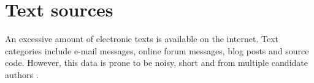 \section{Text sources}
\label{sec:text_sources}

An excessive amount of electronic texts is available on the internet.
Text categories include e-mail messages, online forum messages, blog posts and source code.
However, this data is prone to be noisy, short and from multiple candidate authors \cite{stamatatos_survey_2009}.